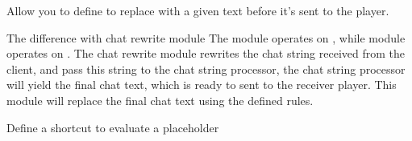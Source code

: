 \label{ch:chat_replace}
Allow you to define  to replace  with a given text before it's sent to the player.

\begin{note}{The difference with chat rewrite module}
    The  module operates on , while  module operates on .
    The chat rewrite module rewrites the chat string received from the client, and pass this string to the chat string processor, the chat string processor will yield the final chat text, which is ready to sent to the receiver player.
    This module will replace the final chat text using the defined rules.
\end{note}

\begin{example}{Define a shortcut to evaluate a placeholder}
\end{example}